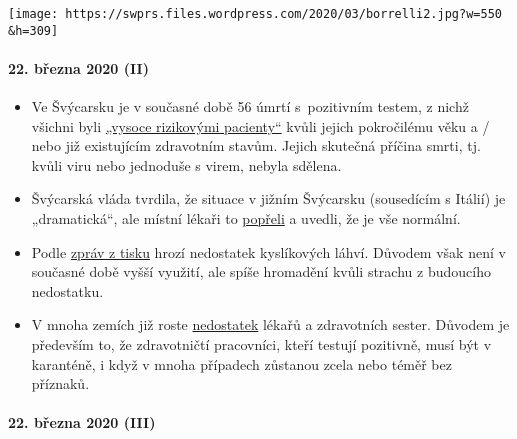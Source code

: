 \texttt{[image: https://swprs.files.wordpress.com/2020/03/borrelli2.jpg?w=550\\\&h=309]}

\hypertarget{22-bux159ezna-2020-ii}{%
\paragraph{22. března 2020 (II)}\label{22-bux159ezna-2020-ii}}

\begin{itemize}
\tightlist
\item
  Ve Švýcarsku je v současné době 56 úmrtí s~pozitivním testem, z nichž
  všichni byli
  \href{https://www.nzz.ch/schweiz/coronavirus-in-der-schweiz-die-neusten-entwicklungen-ld.1542664\#subtitle-wie-viele-infizierte-und-todesf-lle-gibt-es-second}{„vysoce
  rizikovými pacienty``} kvůli jejich pokročilému věku a / nebo již
  existujícím zdravotním stavům. Jejich skutečná příčina smrti, tj.
  kvůli viru nebo jednoduše s virem, nebyla sdělena.
\item
  Švýcarská vláda tvrdila, že situace v jižním Švýcarsku (sousedícím s
  Itálií) je „dramatická``, ale místní lékaři to
  \href{https://www.nzz.ch/schweiz/punkto-intensivbetten-sind-wir-im-tessin-besser-ausgeruestet-als-der-rest-der-schweiz-ld.1547728}{popřeli}
  a uvedli, že je vše normální.
\item
  Podle
  \href{https://www.blick.ch/news/schweiz/nicht-nur-beatmungsgeraete-werden-knapp-im-kampf-gegen-corona-es-droht-ein-engpass-beim-sauerstoff-id15808185.html}{zpráv
  z tisku} hrozí nedostatek kyslíkových láhví. Důvodem však není v
  současné době vyšší využití, ale spíše hromadění kvůli strachu z
  budoucího nedostatku.
\item
  V mnoha zemích již roste
  \href{https://www.washingtonpost.com/health/covid-19-hits-doctors-nurses-emts-threatening-health-system/2020/03/17/f21147e8-67aa-11ea-b313-df458622c2cc_story.html}{nedostatek}
  lékařů a zdravotních sester. Důvodem je především to, že zdravotničtí
  pracovníci, kteří testují pozitivně, musí být v karanténě, i když v
  mnoha případech zůstanou zcela nebo téměř bez příznaků.
\end{itemize}

\hypertarget{22-bux159ezna-2020-iii}{%
\paragraph{22. března 2020 (III)}\label{22-bux159ezna-2020-iii}}

